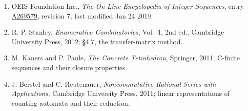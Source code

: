 \documentclass[11pt]{article}
\theoremstyle{definition}
\begin{document}
\begin{enumerate}

\item OEIS Foundation Inc., \emph{The On-Line Encyclopedia of Integer Sequences}, entry \href{https://oeis.org/A269579}{A269579}, revision 7, last modified Jan 24 2019.

\item R. P. Stanley, \emph{Enumerative Combinatorics}, Vol.~1, 2nd ed., Cambridge University Press, 2012; \S4.7, the transfer-matrix method.

\item M. Kauers and P. Paule, \emph{The Concrete Tetrahedron}, Springer, 2011; C-finite sequences and their closure properties.

\item J. Berstel and C. Reutenauer, \emph{Noncommutative Rational Series with Applications}, Cambridge University Press, 2011; linear representations of counting automata and their reduction.

\end{enumerate}
\end{document}
